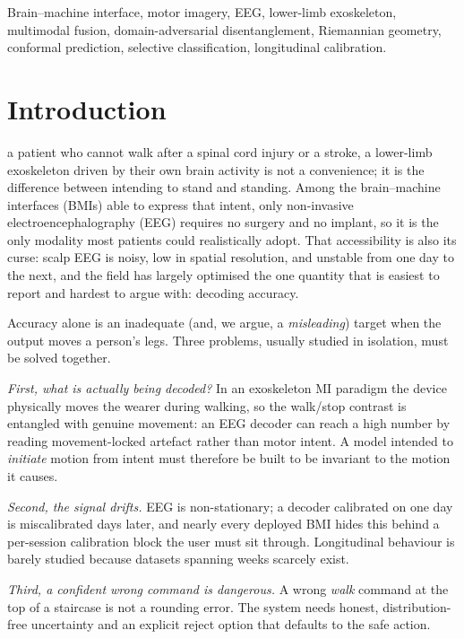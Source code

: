 \documentclass[conference]{IEEEtran}
\begin{document}
\begin{IEEEkeywords}
Brain--machine interface, motor imagery, EEG, lower-limb exoskeleton, multimodal
fusion, domain-adversarial disentanglement, Riemannian geometry, conformal
prediction, selective classification, longitudinal calibration.
\end{IEEEkeywords}

\section{Introduction}
 a patient who cannot walk after a spinal cord injury or a
stroke, a lower-limb exoskeleton driven by their own brain activity is not a
convenience; it is the difference between intending to stand and standing. Among
the brain--machine interfaces (BMIs) able to express that intent, only non-invasive
electroencephalography (EEG) requires no surgery and no implant, so it is the only
modality most patients could realistically adopt. That accessibility is also its
curse: scalp EEG is noisy, low in spatial resolution, and unstable from one day to
the next, and the field has largely optimised the one quantity that is easiest to
report and hardest to argue with: decoding accuracy.

Accuracy alone is an inadequate (and, we argue, a \emph{misleading}) target when
the output moves a person's legs. Three problems, usually studied in isolation, must
be solved together.

\emph{First, what is actually being decoded?} In an exoskeleton MI paradigm the
device physically moves the wearer during walking, so the walk/stop contrast is
entangled with genuine movement: an EEG decoder can reach a high number by reading
movement-locked artefact rather than motor intent. A model intended to
\emph{initiate} motion from intent must therefore be built to be invariant to the
motion it causes.

\emph{Second, the signal drifts.} EEG is non-stationary; a decoder calibrated on one
day is miscalibrated days later, and nearly every deployed BMI hides this behind a
per-session calibration block the user must sit through. Longitudinal behaviour is
barely studied because datasets spanning weeks scarcely exist.

\emph{Third, a confident wrong command is dangerous.} A wrong \emph{walk} command at
the top of a staircase is not a rounding error. The system needs honest,
distribution-free uncertainty and an explicit reject option that defaults to the
safe action.
\end{document}
